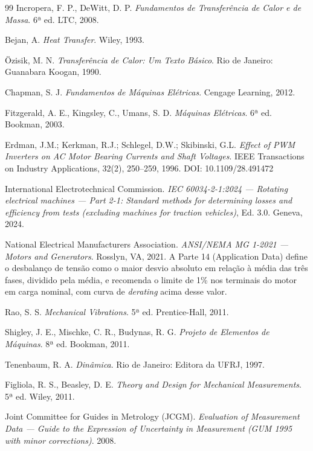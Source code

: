 \documentclass[12pt,a4paper]{article}
\numberwithin{equation}{section}
\numberwithin{table}{section}
\numberwithin{figure}{section}
\begin{document}
{\begin{thebibliography}{99}
 Incropera, F. P., DeWitt, D. P. \textit{Fundamentos de Transferência de Calor e de Massa}. 6ª ed. LTC, 2008.

 Bejan, A. \textit{Heat Transfer}. Wiley, 1993.

 Özisik, M. N. \textit{Transferência de Calor: Um Texto Básico}. Rio de Janeiro: Guanabara Koogan, 1990.

 Chapman, S. J. \textit{Fundamentos de Máquinas Elétricas}. Cengage Learning, 2012.

 Fitzgerald, A. E., Kingsley, C., Umans, S. D. \textit{Máquinas Elétricas}. 6ª ed. Bookman, 2003.

 Erdman, J.M.; Kerkman, R.J.; Schlegel, D.W.; Skibinski, G.L. \textit{Effect of PWM Inverters on AC Motor Bearing Currents and Shaft Voltages}. IEEE Transactions on Industry Applications, 32(2), 250--259, 1996. DOI: 10.1109/28.491472

 International Electrotechnical Commission. \textit{IEC 60034-2-1:2024 — Rotating electrical machines — Part 2-1: Standard methods for determining losses and efficiency from tests (excluding machines for traction vehicles)}, Ed. 3.0. Geneva, 2024.

 National Electrical Manufacturers Association. \textit{ANSI/NEMA MG 1-2021 — Motors and Generators}. Rosslyn, VA, 2021. A Parte 14 (Application Data) define o desbalanço de tensão como o maior desvio absoluto em relação à média das três fases, dividido pela média, e recomenda o limite de 1\% nos terminais do motor em carga nominal, com curva de \textit{derating} acima desse valor.

 Rao, S. S. \textit{Mechanical Vibrations}. 5ª ed. Prentice-Hall, 2011.

 Shigley, J. E., Mischke, C. R., Budynas, R. G. \textit{Projeto de Elementos de Máquinas}. 8ª ed. Bookman, 2011.

 Tenenbaum, R. A. \textit{Dinâmica}. Rio de Janeiro: Editora da UFRJ, 1997.

 Figliola, R. S., Beasley, D. E. \textit{Theory and Design for Mechanical Measurements}. 5ª ed. Wiley, 2011.

 Joint Committee for Guides in Metrology (JCGM). \textit{Evaluation of Measurement Data — Guide to the Expression of Uncertainty in Measurement (GUM 1995 with minor corrections)}. 2008.


\end{thebibliography}}
\end{document}
